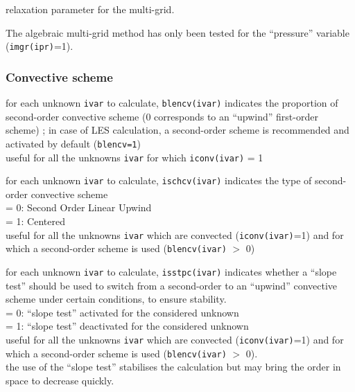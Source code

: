 {relaxation parameter for the multi-grid.
}

The algebraic multi-grid method has only been tested for
the ``pressure'' variable ({\tt imgr(ipr)}=1).

\subsubsection{Convective scheme}

{for each unknown {\tt ivar} to calculate, {\tt blencv(ivar)} indicates the
 proportion of second-order convective scheme (0 corresponds to an
``upwind'' first-order scheme) ; in case of LES calculation, a
second-order scheme is recommended and activated by default ({\tt blencv=1})\\
useful for all the unknowns {\tt ivar} for which {\tt iconv(ivar)} = 1}

{for each unknown {\tt ivar} to calculate, {\tt ischcv(ivar)} indicates the type of second-order
convective scheme\\
\hspace*{1.3cm}= 0: Second Order Linear Upwind\\
\hspace*{1.3cm}= 1: Centered\\
useful for all the unknowns {\tt ivar} which are convected
({\tt iconv(ivar)}=1) and
for which a second-order scheme is used ({\tt blencv(ivar)} $>$ 0)}

{for each unknown {\tt ivar} to calculate, {\tt isstpc(ivar)}
indicates whether a ``slope test'' should
be used to switch from a second-order to an ``upwind'' convective
scheme under certain conditions, to ensure stability.\\
\hspace*{1.3cm}= 0: ``slope test'' activated for the considered unknown\\
\hspace*{1.3cm}= 1: ``slope test'' deactivated for the considered unknown\\
useful for all the unknowns {\tt ivar}  which are convected
({\tt iconv(ivar)}=1) and
for which a second-order scheme is used ({\tt blencv(ivar)} $>$ 0).\\
the use of the ``slope test'' stabilises the calculation but may bring
the order in space to decrease quickly.}

